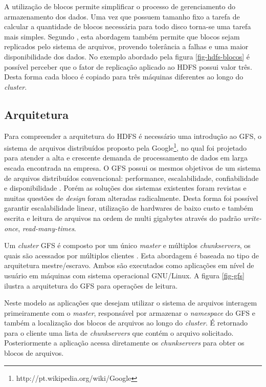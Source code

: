 A utilização de blocos permite simplificar o processo de gerenciamento do armazenamento dos dados. Uma vez que possuem tamanho fixo a tarefa de calcular a quantidade de blocos necessária para todo disco torna-se uma tarefa mais simples. Segundo , esta abordagem também permite que blocos sejam replicados pelo sistema de arquivos, provendo tolerância a falhas e uma maior disponibilidade dos dados. No exemplo abordado pela figura \ref{fig-hdfs-blocos} é possível perceber que o fator de replicação aplicado ao HDFS possui valor três. Desta forma cada bloco é copiado para três máquinas diferentes ao longo do \textit{cluster}.

\subsection{Arquitetura}
\label{sec-hdfs-arquitetura}

Para compreender a arquitetura do HDFS é necessário uma introdução ao GFS, o sistema de arquivos distribuídos proposto pela Google\footnote{http://pt.wikipedia.org/wiki/Google}, no qual foi projetado para atender a alta e crescente demanda de processamento de dados em larga escada encontrada na empresa. O GFS possui os mesmos objetivos de um sistema de arquivos distribuídos convencional: performance, escalabilidade, confiabilidade e disponibilidade \cite{ghemawatGfs2003}. Porém as soluções dos sistemas existentes foram revistas e muitas questões de \textit{design} foram alteradas radicalmente. Desta forma foi possível garantir escalabilidade linear, utilização de hardwares de baixo custo e também escrita e leitura de arquivos na ordem de multi gigabytes através do padrão \textit{write-once}, \textit{read-many-times}. 

Um \textit{cluster} GFS é composto por um único \textit{master} e múltiplos \textit{chunkservers}, os quais são acessados por múltiplos clientes \cite{ghemawatGfs2003}. Esta abordagem é baseada no tipo de arquitetura mestre/escravo. Ambos são executados como aplicações em nível de usuário em máquinas com sistema operacional GNU/Linux. A figura \ref{fig-gfs} ilustra a arquitetura do GFS para operações de leitura.

Neste modelo as aplicações que desejam utilizar o sistema de arquivos interagem primeiramente com o \textit{master}, responsável por armazenar o \textit{namespace} do GFS e também a localização dos blocos de arquivos ao longo do \textit{cluster}. É retornado para o cliente uma lista de \textit{chunkservers} que contém o arquivo solicitado. Posteriormente a aplicação acessa diretamente os \textit{chunkservers} para obter os blocos de arquivos.

